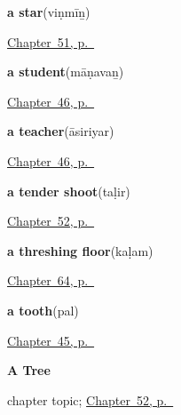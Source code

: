 \noindent\begin{minipage}[t]{\linewidth}
\raggedright
\textbf{a star}\enspace\emph{}\enspace(viṇmīṉ)\par
\footnotesize \hyperref[ch:ta-overhead]{Chapter~51, p.~\pageref*{ch:ta-overhead}}
\end{minipage}\par\smallskip

\noindent\begin{minipage}[t]{\linewidth}
\raggedright
\textbf{a student}\enspace\emph{}\enspace(māṇavaṉ)\par
\footnotesize \hyperref[ch:ta-roles]{Chapter~46, p.~\pageref*{ch:ta-roles}}
\end{minipage}\par\smallskip

\noindent\begin{minipage}[t]{\linewidth}
\raggedright
\textbf{a teacher}\enspace\emph{}\enspace(āsiriyar)\par
\footnotesize \hyperref[ch:ta-roles]{Chapter~46, p.~\pageref*{ch:ta-roles}}
\end{minipage}\par\smallskip

\noindent\begin{minipage}[t]{\linewidth}
\raggedright
\textbf{a tender shoot}\enspace\emph{}\enspace(taḷir)\par
\footnotesize \hyperref[ch:ta-a-tree]{Chapter~52, p.~\pageref*{ch:ta-a-tree}}
\end{minipage}\par\smallskip

\noindent\begin{minipage}[t]{\linewidth}
\raggedright
\textbf{a threshing floor}\enspace\emph{}\enspace(kaḷam)\par
\footnotesize \hyperref[ch:ta-the-harvest]{Chapter~64, p.~\pageref*{ch:ta-the-harvest}}
\end{minipage}\par\smallskip

\noindent\begin{minipage}[t]{\linewidth}
\raggedright
\textbf{a tooth}\enspace\emph{}\enspace(pal)\par
\footnotesize \hyperref[ch:ta-body-more]{Chapter~45, p.~\pageref*{ch:ta-body-more}}
\end{minipage}\par\smallskip

\noindent\begin{minipage}[t]{\linewidth}
\raggedright
\textbf{A Tree}\par
\footnotesize chapter topic; \hyperref[ch:ta-a-tree]{Chapter~52, p.~\pageref*{ch:ta-a-tree}}
\end{minipage}\par\smallskip

